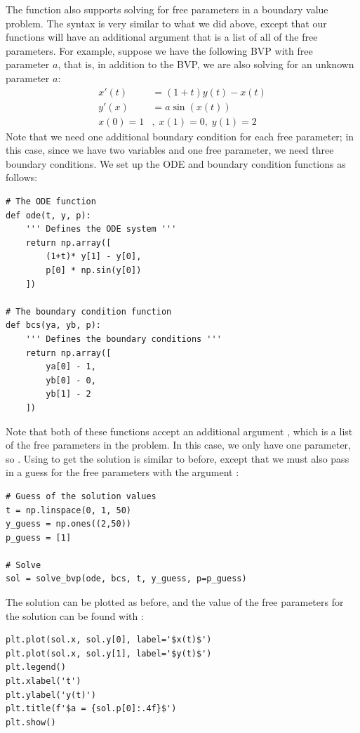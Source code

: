 The function  also supports solving for free parameters in a boundary value problem.
The syntax is very similar to what we did above, except that our functions will have an additional argument that is a list of all of the free parameters.
For example, suppose we have the following BVP with free parameter \(a\), that is, in addition to the BVP, we are also solving for an unknown parameter \(a\):
\begin{align*}
x'(t) &= (1+t)y(t)-x(t) \\
y'(x) &= a\sin(x(t))
\\
x(0)=1&,\; x(1)=0,\; y(1)=2
\end{align*}
Note that we need one additional boundary condition for each free parameter; in this case, since we have two variables and one free parameter, we need three boundary conditions.
We set up the ODE and boundary condition functions as follows:
\begin{lstlisting}
# The ODE function
def ode(t, y, p):
    ''' Defines the ODE system '''
    return np.array([
        (1+t)* y[1] - y[0],
        p[0] * np.sin(y[0])
    ])

# The boundary condition function
def bcs(ya, yb, p):
    ''' Defines the boundary conditions '''
    return np.array([
        ya[0] - 1,
        yb[0] - 0,
        yb[1] - 2
    ])
\end{lstlisting}
Note that both of these functions accept an additional argument , which is a list of the free parameters in the problem.
In this case, we only have one parameter, so .
Using  to get the solution is similar to before, except that we must also pass in a guess for the free parameters with the argument :
\begin{lstlisting}
# Guess of the solution values
t = np.linspace(0, 1, 50)
y_guess = np.ones((2,50))
p_guess = [1]

# Solve
sol = solve_bvp(ode, bcs, t, y_guess, p=p_guess)
\end{lstlisting}
The solution can be plotted as before, and the value of the free parameters for the solution can be found with :
\begin{lstlisting}
plt.plot(sol.x, sol.y[0], label='$x(t)$')
plt.plot(sol.x, sol.y[1], label='$y(t)$')
plt.legend()
plt.xlabel('t')
plt.ylabel('y(t)')
plt.title(f'$a = {sol.p[0]:.4f}$')
plt.show()
\end{lstlisting}

